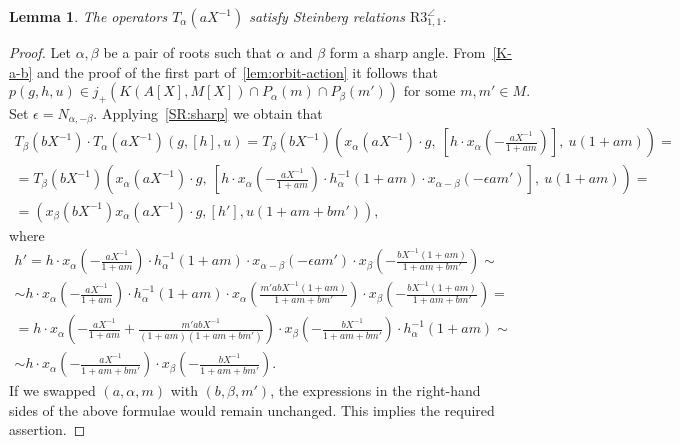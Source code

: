 \documentclass[oneside, 8pt]{amsart}
\newtheorem{lemma}{Lemma}
\theoremstyle{remark}
\theoremstyle{definition}
\numberwithin{lemma}{section}
\numberwithin{prop}{section}
\numberwithin{corollary}{section}
\numberwithin{externaltheorem}{section}
\numberwithin{equation}{section}
\begin{document}
\begin{lemma} \label{R3_1_1} The operators $T_\alpha(aX^{-1})$ satisfy Steinberg relations $\mathrm{R3}_{1,1}^{\angle}$. \end{lemma}
\begin{proof}
Let $\alpha, \beta$ be a pair of roots such that $\alpha$ and $\beta$ form a sharp angle.
From~\cref{K-a-b} and the proof of the first part of~\cref{lem:orbit-action} it follows that \[p(g, h, u) \in j_+\left(K(A[X], M[X]) \cap P_\alpha(m) \cap P_{\beta}(m')\right)\text{ for some }m,m' \in M.\]
Set $\epsilon = N_{\alpha,-\beta}$. Applying~\cref{SR:sharp} we obtain that
\begin{multline} \nonumber
 T_\beta(bX^{-1}) \cdot T_\alpha(aX^{-1}) \left(g, [h], u\right) = 
 T_\beta(bX^{-1}) \left(x_\alpha(aX^{-1})\cdot g,\ \left[h \cdot x_\alpha\left(-\tfrac{aX^{-1}}{1 + am}\right)\right],\ u(1 + am)\right) = \\ 
 = T_\beta(bX^{-1}) \left(x_\alpha(aX^{-1})\cdot g,\ \left[h \cdot x_\alpha\left(-\tfrac{aX^{-1}}{1 + am}\right) \cdot h^{-1}_\alpha(1 + am) \cdot x_{\alpha-\beta}(-\epsilon am')\right],\ u(1 + am)\right) = \\
 = (x_\beta(bX^{-1}) x_\alpha(aX^{-1}) \cdot g, [h'], u(1 + am + bm')), \end{multline}
where 
\begin{multline} \nonumber
 h' = h \cdot x_\alpha\left(-\tfrac{aX^{-1}}{1 + am}\right) \cdot h^{-1}_\alpha(1 + am) \cdot x_{\alpha-\beta}(-\epsilon am') \cdot x_\beta\left(-\tfrac{bX^{-1}(1+am)}{1 + am + bm'}\right) \sim \\
    \sim h \cdot x_\alpha\left(-\tfrac{aX^{-1}}{1 + am}\right) \cdot h^{-1}_\alpha(1 + am) \cdot x_{\alpha}\left(\tfrac{m'abX^{-1}(1+am)}{1 + am + bm'}\right) \cdot x_\beta\left(-\tfrac{bX^{-1}(1+am)}{1 + am + bm'}\right) = \\
 = h \cdot x_\alpha\left(-\tfrac{aX^{-1}}{1 + am} + \tfrac{m'abX^{-1}}{(1+am)(1 + am + bm')}\right) \cdot x_\beta\left(-\tfrac{bX^{-1}}{1 + am + bm'}\right) \cdot h^{-1}_\alpha(1 + am) \sim \\
 \sim h \cdot x_\alpha\left(-\tfrac{aX^{-1}}{1 + am + bm'}\right) \cdot x_\beta\left(-\tfrac{bX^{-1}}{1 + am + bm'}\right).
\end{multline}
If we swapped $(a,\alpha,m)$ with $(b,\beta,m')$, 
the expressions in the right-hand sides of the above formulae would remain unchanged. This implies the required assertion.
\end{proof}
\end{document}
